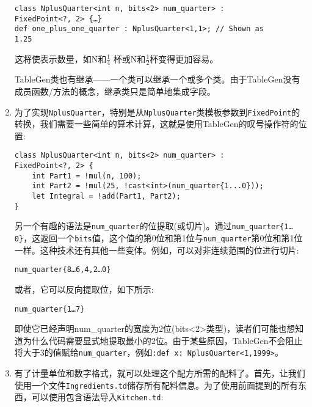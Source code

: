 \begin{enumerate}
\begin{lstlisting}[style=styleCXX]
class NplusQuarter<int n, bits<2> num_quarter> :
FixedPoint<?, 2> {…}
def one_plus_one_quarter : NplusQuarter<1,1>; // Shown as
1.25
\end{lstlisting}

这将使表示数量，如N和$\frac{1}{4}$ 杯或N和$\frac{1}{2}$杯变得更加容易。

TableGen类也有继承——一个类可以继承一个或多个类。由于TableGen没有成员函数/方法的概念，继承类只是简单地集成字段。

\item 为了实现\texttt{NplusQuarter}，特别是从\texttt{NplusQuarter}类模板参数到\texttt{FixedPoint}的转换，我们需要一些简单的算术计算，这就是使用TableGen的叹号操作符的位置:

\begin{lstlisting}[style=styleCXX]
class NplusQuarter<int n, bits<2> num_quarter> :
FixedPoint<?, 2> {
	int Part1 = !mul(n, 100);
	int Part2 = !mul(25, !cast<int>(num_quarter{1...0}));
	let Integral = !add(Part1, Part2);
}
\end{lstlisting}

另一个有趣的语法是\texttt{num\_quarter}的位提取(或切片)。通过\texttt{num\_quarter\{1…0\}}，这返回一个\texttt{bits}值，这个值的第0位和第1位与\texttt{num\_quarter}第0位和第1位一样。这种技术还有其他一些变体。例如，可以对非连续范围的位进行切片:

\begin{lstlisting}[style=styleCXX]
num_quarter{8…6,4,2…0}
\end{lstlisting}

或者，它可以反向提取位，如下所示:

\begin{lstlisting}[style=styleCXX]
num_quarter{1…7}
\end{lstlisting}

\begin{tcolorbox}[colback=blue!5!white,colframe=blue!75!black, fonttitle=\bfseries,title=Note]
\hspace*{0.7cm}即使它已经声明num\_quarter的宽度为2位(bits<2>类型)，读者们可能也想知道为什么代码需要显式地提取最小的2位。由于某些原因，TableGen不会阻止将大于3的值赋给\texttt{num\_quarter}，例如\texttt{:def x: NplusQuarter<1,1999>}。
\end{tcolorbox}

\item 有了计量单位和数字格式，就可以处理这个配方所需的配料了。首先，让我们使用一个文件\texttt{Ingredients.td}储存所有配料信息。为了使用前面提到的所有东西，可以使用包含语法导入\texttt{Kitchen.td}:


\end{enumerate}

